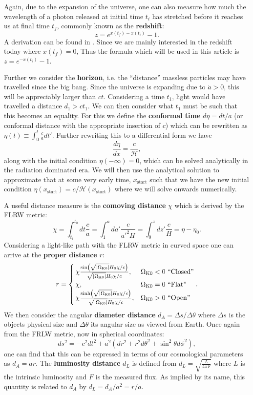 \documentclass[%
reprint,
 amsmath,amssymb,
 aps,
]{revtex4-2}
\newcommand{\Hp}{\mathcal{H}}
\begin{document}
Again, due to the expansion of the universe, one can also measure how much the wavelength of a photon released at initial time $t_i$ has stretched before it reaches us at final time $t_f$, commonly known as the \textbf{redshift}:
\[z=e^{x(t_f)-x(t_i)}-1.\]
A derivation can be found in \cite{Davis_2004}. Since we are mainly interested in the redshift today where $x(t_f)=0$, Thus the formula which will be used in this article is $z=e^{-x(t_i)}-1$.

Further we consider the \textbf{horizon}, i.e. the ``distance'' massless particles may have travelled since the big bang. Since the universe is expanding due to $\dot a>0$, this will be appreciably larger than $ct$. Considering a time $t_1$, light would have travelled a distance $d_1>ct_1$. We can then consider what $t_1$ must be such that this becomes an equality. For this we define the \textbf{conformal time} $d\eta=dt/a$ (or conformal distance with the appropriate insertion of $c$) which can be rewritten as $\eta(t)\equiv\int_0^t\frac{c}{a}dt'$. Further rewriting this to a differential form we have
\begin{equation}
	\frac{d\eta}{dx}=\frac{c}{\Hp},\label{eq:detaODE}
\end{equation}
along with the initial condition $\eta(-\infty)=0$, which can be solved analytically in the radiation dominated era. We will then use the analytical solution to approximate that at some very early time, $x_\text{start}$ such that we have the new initial condition $\eta(x_\text{start})=c/\Hp(x_\text{start})$ where we will solve onwards numerically. 

A useful distance measure is the \textbf{comoving distance} $\chi$ which is derived by the FLRW metric:
\[\chi=\int_{t_i}^{t_0}dt\frac{c}{a}=\int_1^ada'\frac{c}{a'^2H}=\int_0^zdz'\frac{c}{H}=\eta-\eta_0.\]
Considering a light-like path with the FLRW metric in curved space one can arrive at the \textbf{proper distance} $r$:
\[
r=
\begin{cases}
	\,\chi\frac{\sin(\sqrt{\left|\Omega_{\text K0}\right|}H_0\chi/c)}{\sqrt{\left|\Omega_{\text K0}\right|}H_0\chi/c},& \Omega_{\text K0}<0~\text{``Closed''}\\
	\,\chi, & \Omega_{\text K0}=0~\text{``Flat''}\\
	\,\chi\frac{\sinh(\sqrt{\left|\Omega_{\text K0}\right|}H_0\chi/c)}{\sqrt{\left|\Omega_{\text K0}\right|}H_0\chi/c},& \Omega_{\text K0}>0~\text{``Open''}
\end{cases}.
\]
We then consider the angular \textbf{diameter distance} $d_A=\Delta s/\Delta \theta$ where $\Delta s$ is the objects physical size and $\Delta \theta$ its angular size as viewed from Earth. Once again from the FRLW metric, now in spherical coordinates:
\[ds^2=-c^2dt^2+a^2(dr^2+r^2d\theta^2+\sin^2\theta d\phi^2),\]
one can find that this can be expressed in terms of our cosmological parameters as $d_A=ar$. The \textbf{luminosity distance} $d_L$ is defined from $d_L=\sqrt{\frac{L}{4\pi F}}$ where $L$ is the intrinsic luminosity and $F$ is the measured flux. As implied by its name, this quantity is related to $d_A$ by $d_L=d_A/a^2=r/a$. 
\end{document}
